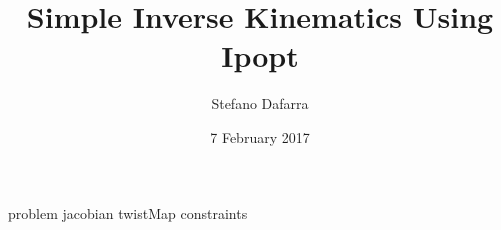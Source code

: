 \documentclass[10 pt]{article}  %
\date{7 February 2017}
\title{\LARGE \bf
Simple Inverse Kinematics Using Ipopt}
\author{Stefano Dafarra}
\begin{document}
	
\maketitle
\thispagestyle{empty}
\pagestyle{empty}




{problem}
{jacobian}
{twistMap}
{constraints}

\addtolength{\textheight}{0cm}   %




\end{document}
